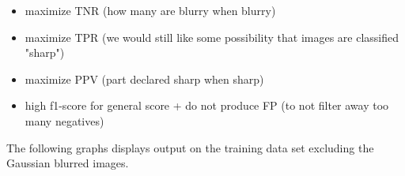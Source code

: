 \begin{itemize}
    \item maximize TNR (how many are blurry when blurry)
    \item maximize TPR (we would still like some possibility that images are classified "sharp")
    \item maximize PPV (part declared sharp when sharp)
    \item high f1-score for general score + do not produce FP (to not filter away too many negatives)
\end{itemize}


The following graphs displays output on the training data set excluding the Gaussian blurred images.



